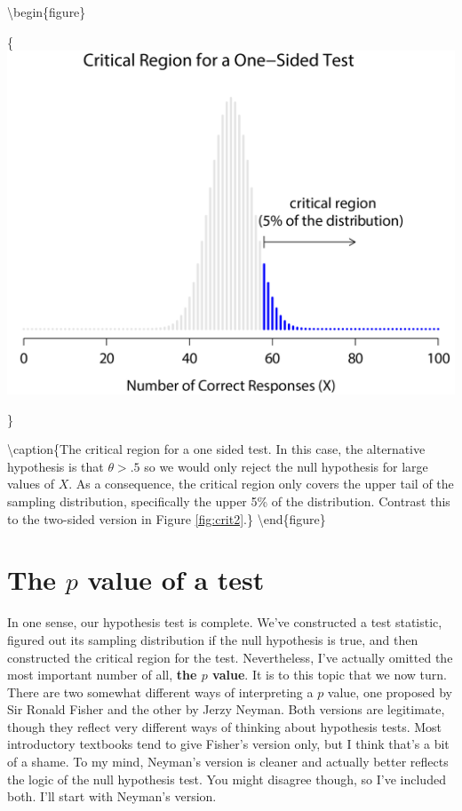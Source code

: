 \documentclass[
]{book}
\begin{document}
\textbackslash begin\{figure\}

\{\centering \includegraphics[width=1\linewidth]{img/nhst/rejectionRegion2}

\}

\textbackslash caption\{The critical region for a one sided test. In this case, the alternative hypothesis is that \(\theta > .5\) so we would only reject the null hypothesis for large values of \(X\). As a consequence, the critical region only covers the upper tail of the sampling distribution, specifically the upper 5\% of the distribution. Contrast this to the two-sided version in Figure \ref{fig:crit2}.\}\label{fig:crit1}
\textbackslash end\{figure\}

\hypertarget{pvalue}{%
\section{\texorpdfstring{The \(p\) value of a test}{The p value of a test}}\label{pvalue}}

In one sense, our hypothesis test is complete. We've constructed a test statistic, figured out its sampling distribution if the null hypothesis is true, and then constructed the critical region for the test. Nevertheless, I've actually omitted the most important number of all, {\textbf{the \(p\) value}}. It is to this topic that we now turn. There are two somewhat different ways of interpreting a \(p\) value, one proposed by Sir Ronald Fisher and the other by Jerzy Neyman. Both versions are legitimate, though they reflect very different ways of thinking about hypothesis tests. Most introductory textbooks tend to give Fisher's version only, but I think that's a bit of a shame. To my mind, Neyman's version is cleaner and actually better reflects the logic of the null hypothesis test. You might disagree though, so I've included both. I'll start with Neyman's version.
\end{document}
